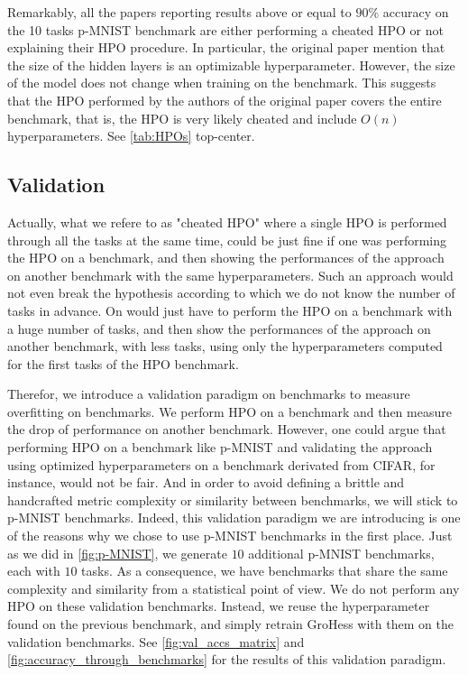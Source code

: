 \documentclass[11pt]{article}
\begin{document}
\vspace{2mm}
\noindent
Remarkably, all the papers reporting results above or equal to $90\%$ accuracy on the 10 tasks p-MNIST benchmark are either performing a cheated HPO or not explaining their HPO procedure. In particular, the original paper mention that the size of the hidden layers is an optimizable hyperparameter. However, the size of the model does not change when training on the benchmark. This suggests that the HPO performed by the authors of the original paper covers the entire benchmark, that is, the HPO is very likely cheated and include $O(n)$ hyperparameters. See \ref{tab:HPOs} top-center.


\subsection{Validation}


Actually, what we refere to as "cheated HPO" where a single HPO is performed through all the tasks at the same time, could be just fine if one was performing the HPO on a benchmark, and then showing the performances of the approach on another benchmark with the same hyperparameters. Such an approach would not even break the hypothesis according to which we do not know the number of tasks in advance. On would just have to perform the HPO on a benchmark with a huge number of tasks, and then show the performances of the approach on another benchmark, with less tasks, using only the hyperparameters computed for the first tasks of the HPO benchmark.

\vspace{2mm}
\noindent
Therefor, we introduce a validation paradigm on benchmarks to measure overfitting on benchmarks. We perform HPO on a benchmark and then measure the drop of performance on another benchmark. However, one could argue that performing HPO on a benchmark like p-MNIST and validating the approach using optimized hyperparameters on a benchmark derivated from CIFAR, for instance, would not be fair. And in order to avoid defining a brittle and handcrafted metric complexity or similarity between benchmarks, we will stick to p-MNIST benchmarks. Indeed, this validation paradigm we are introducing is one of the reasons why we chose to use p-MNIST benchmarks in the first place. Just as we did in \ref{fig:p-MNIST}, we generate $10$ additional p-MNIST benchmarks, each with $10$ tasks. As a consequence, we have benchmarks that share the same complexity and similarity from a statistical point of view. We do not perform any HPO on these validation benchmarks. Instead, we reuse the hyperparameter found on the previous benchmark, and simply retrain GroHess with them on the validation benchmarks. See \ref{fig:val_accs_matrix} and \ref{fig:accuracy_through_benchmarks} for the results of this validation paradigm.
\end{document}
